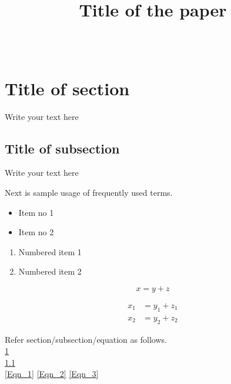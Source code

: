 \documentclass[10pt,journal]{IEEEtran}
\title{Title of the paper}
\author{
  	\IEEEauthorblockN{Author 1}
 	\IEEEauthorblockA{Institute}
 	\IEEEauthorblockA{email@email.com}		
 	\and\\
 	\IEEEauthorblockN{Author 2}
 	\IEEEauthorblockA{Institute}
 	\IEEEauthorblockA{email@email.com}		
}
\begin{document}
\maketitle

\begin{abstract}
%
%
\end{abstract}


\section{Title of section}
\label{Section_section_name_1}

Write your text here

\subsection{Title of subsection}
\label{subSection_section_name_2}

Write your text here

Next is sample usage of frequently used terms.

\begin{itemize}
% 
\item Item no 1
\item Item no 2
%  
\end{itemize}


\begin{enumerate}
% 
\item Numbered item 1
\item Numbered item 2
% 
\end{enumerate}


\begin{equation}
%  
x = y + z
\label{Eqn_1}
% 
\end{equation}


\begin{align}
%  
x_1 &= y_1 + z_1 \label{Eqn_2} \\
% 
x_2 &= y_2 + z_2
% 
\label{Eqn_3}
% 
\end{align}
 

 
Refer section/subsection/equation as follows.\\
\cref{Section_section_name_1} \\
\cref{subSection_section_name_2} \\
\cref{Eqn_1} \cref{Eqn_2} \cref{Eqn_3}


\cite{Lin_Costello_Book, Maxell_Urbanke_2008, Yige_DG_ISIT_2006}
% 










\end{document}
